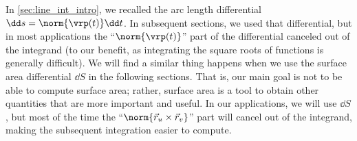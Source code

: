 In \autoref{sec:line_int_intro}, we recalled the arc length differential $\dd s=\norm{\vrp(t)}\dd t$. In subsequent sections, we used that differential, but in most applications the ``$\norm{\vrp(t)}$'' part of the differential canceled out of the integrand (to our benefit, as integrating the square roots of functions is generally difficult). We will find a similar thing happens when we use the surface area differential $\dd S$ in the following sections. That is, our main goal is not to be able to compute surface area; rather, surface area is a tool to obtain other quantities that are more important and useful. In our applications, we will use $\dd S$, but most of the time the ``$\norm{\vec r_u\times \vec r_v}$'' part will cancel out of the integrand, making the subsequent integration easier to compute.

